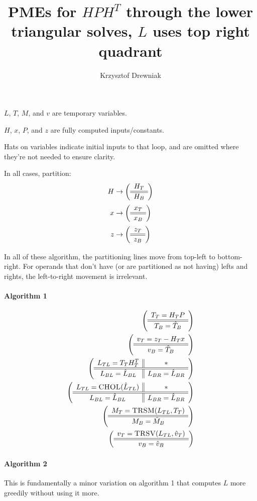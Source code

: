 \documentclass[12pt,letterpaper]{article}
\title{PMEs for $HPH^T$ through the lower triangular solves, $L$ uses top right quadrant}
\author{Krzysztof Drewniak}
\begin{document}
\maketitle{}
$L$, $T$, $M$, and $v$ are temporary variables.

$H$, $x$, $P$, and $z$ are fully computed inputs/constants.

Hats on variables indicate initial inputs to that loop, and are omitted where they're not needed to ensure clarity.

In all cases, partition:
\begin{align*}
  H &\rightarrow \left( \begin{array}{c} H_T \\ \hline \hline H_B \end{array} \right)\\
  x &\rightarrow \left( \begin{array}{c} x_T \\ \hline \hline x_B \end{array} \right)\\
  z &\to \left( \begin{array}{c} z_T \\ \hline \hline z_B \end{array} \right)
\end{align*}

In all of these algorithm, the partitioning lines move from top-left to bottom-right.
For operands that don't have (or are partitioned as not having) lefts and rights, the left-to-right movement is irrelevant.

\paragraph{Algorithm 1}
\begin{align*}
  \left( \begin{array}{c} T_T = H_TP \\ \hline \hline T_B = \hat{T}_B \end{array} \right)\\
  \left( \begin{array}{c} v_T = z_T - H_Tx \\ \hline \hline v_B = \hat{T}_B \end{array} \right)\\
  \left( \begin{array}{c || c} L_{TL} = T_TH^T_T & * \\ \hline \hline L_{BL} = \hat{L}_{BL} & L_{BR} = \hat{L}_{BR} \end{array} \right)\\
  \left( \begin{array}{c || c} L_{TL} = \textsc{CHOL}(\hat{L}_{TL}) & * \\ \hline \hline L_{BL} = \hat{L}_{BL} & L_{BR} = \hat{L}_{BR} \end{array} \right)\\
  \left( \begin{array}{c} M_T = \textsc{TRSM}(L_{TL}, T_T) \\ \hline \hline M_B = \hat{M}_B \end{array} \right)\\
  \left( \begin{array}{c} v_T = \textsc{TRSV}(L_{TL}, \hat{v}_T) \\ \hline \hline v_B = \hat{v}_B \end{array} \right)\\
\end{align*}

\paragraph{Algorithm 2}
This is fundamentally a minor variation on algorithm 1 that computes $L$ more greedily without using it more.
\end{document}
